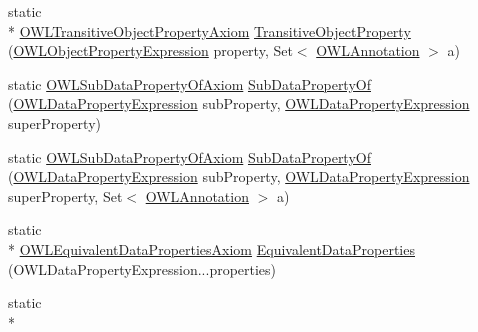 \begin{DoxyCompactItemize}
\item 
static \\*
\hyperlink{interfaceorg_1_1semanticweb_1_1owlapi_1_1model_1_1_o_w_l_transitive_object_property_axiom}{O\-W\-L\-Transitive\-Object\-Property\-Axiom} \hyperlink{classorg_1_1semanticweb_1_1owlapi_1_1apibinding_1_1_o_w_l_functional_syntax_factory_ab7c13e32e02ff9f769207489e82ca9e0}{Transitive\-Object\-Property} (\hyperlink{interfaceorg_1_1semanticweb_1_1owlapi_1_1model_1_1_o_w_l_object_property_expression}{O\-W\-L\-Object\-Property\-Expression} property, Set$<$ \hyperlink{interfaceorg_1_1semanticweb_1_1owlapi_1_1model_1_1_o_w_l_annotation}{O\-W\-L\-Annotation} $>$ a)
\item 
static \hyperlink{interfaceorg_1_1semanticweb_1_1owlapi_1_1model_1_1_o_w_l_sub_data_property_of_axiom}{O\-W\-L\-Sub\-Data\-Property\-Of\-Axiom} \hyperlink{classorg_1_1semanticweb_1_1owlapi_1_1apibinding_1_1_o_w_l_functional_syntax_factory_a6b77b644203b7fb5e4cae776087e398c}{Sub\-Data\-Property\-Of} (\hyperlink{interfaceorg_1_1semanticweb_1_1owlapi_1_1model_1_1_o_w_l_data_property_expression}{O\-W\-L\-Data\-Property\-Expression} sub\-Property, \hyperlink{interfaceorg_1_1semanticweb_1_1owlapi_1_1model_1_1_o_w_l_data_property_expression}{O\-W\-L\-Data\-Property\-Expression} super\-Property)
\item 
static \hyperlink{interfaceorg_1_1semanticweb_1_1owlapi_1_1model_1_1_o_w_l_sub_data_property_of_axiom}{O\-W\-L\-Sub\-Data\-Property\-Of\-Axiom} \hyperlink{classorg_1_1semanticweb_1_1owlapi_1_1apibinding_1_1_o_w_l_functional_syntax_factory_a41519cfb7df051843e8dc39ef785bd8b}{Sub\-Data\-Property\-Of} (\hyperlink{interfaceorg_1_1semanticweb_1_1owlapi_1_1model_1_1_o_w_l_data_property_expression}{O\-W\-L\-Data\-Property\-Expression} sub\-Property, \hyperlink{interfaceorg_1_1semanticweb_1_1owlapi_1_1model_1_1_o_w_l_data_property_expression}{O\-W\-L\-Data\-Property\-Expression} super\-Property, Set$<$ \hyperlink{interfaceorg_1_1semanticweb_1_1owlapi_1_1model_1_1_o_w_l_annotation}{O\-W\-L\-Annotation} $>$ a)
\item 
static \\*
\hyperlink{interfaceorg_1_1semanticweb_1_1owlapi_1_1model_1_1_o_w_l_equivalent_data_properties_axiom}{O\-W\-L\-Equivalent\-Data\-Properties\-Axiom} \hyperlink{classorg_1_1semanticweb_1_1owlapi_1_1apibinding_1_1_o_w_l_functional_syntax_factory_a19409c37b412dbc0a974f901db8acc3c}{Equivalent\-Data\-Properties} (O\-W\-L\-Data\-Property\-Expression...\-properties)
\item 
static \\*

\end{DoxyCompactItemize}
